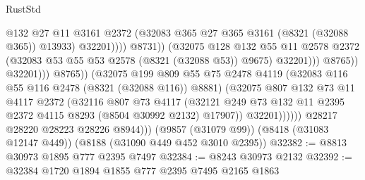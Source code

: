 \begin{lexlean}{RustStd}
\begin{coremodule}
                                                @132
                                                @27
                                                @11
                                                @3161
                                                @2372
                                                (@32083
                                                  @365
                                                  @27
                                                  @365
                                                  @3161
                                                  (@8321 (@32088 @365))
                                                  @13933)
                                                @32201))))
                                        @8731))
                                    (@32075
                                      @128
                                      @132
                                      @55
                                      @11
                                      @2578
                                      @2372
                                      (@32083 @53 @55 @53 @2578 (@8321 (@32088 @53)) @9675)
                                      @32201)))
                                @8765))
                            @32201)))
                      @8765))
                  (@32075
                    @199
                    @809
                    @55
                    @75
                    @2478
                    @4119
                    (@32083 @116 @55 @116 @2478 (@8321 (@32088 @116)) @8881)
                    (@32075
                      @807
                      @132
                      @73
                      @11
                      @4117
                      @2372
                      (@32116
                        @807
                        @73
                        @4117
                        (@32121
                          @249
                          @73
                          @132
                          @11
                          @2395
                          @2372
                          @4115
                          @8293
                          (@8504 @30992 @2132)
                          @17907))
                      @32201))))))
          @28217
          @28220
          @28223
          @28226
          @8944)))
    (@9857 (@31079 @99))
    (@8418 (@31083 @12147 @449))
    (@8188 (@31090 @449 @452 @3010 @2395))
@32382 := @8813 @30973 @1895 @777 @2395 @7497
@32384 := @8243 @30973 @2132
@32392 := @32384 @1720 @1894 @1855 @777 @2395 @7495 @2165 @1863

\end{coremodule}
\end{lexlean}
